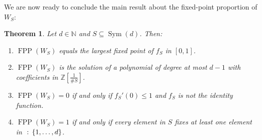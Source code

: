 \documentclass{amsart}
\def\set#1{{\def\st{\;:\;}\left\{#1\right\}}}
\def\ZZ{\mathbb Z}
\def\NN{\mathbb N}
\DeclareMathOperator{\FPP}{FPP}
\DeclareMathOperator{\Sym}{Sym}
\DeclareMathOperator{\st}{st}
\newtheorem{theorem}[Proposition]{Theorem}
\begin{document}
We are now ready to conclude the main result about the fixed-point proportion of $W_S$:

\begin{theorem}
Let $d \in \NN$ and $S \subseteq \Sym(d)$. Then: 
\begin{enumerate}
    \item $\FPP(W_S)$ equals the largest fixed point of $f_S$ in $[0,1]$.
    \item $\FPP(W_S)$ is the solution of a polynomial of degree at most $d-1$ with coefficients in $\ZZ\left[\frac{1}{\# S}\right]$. 
    \item $\FPP(W_S) = 0$ if and only if $f_S'(0) \leq 1$ and $f_S$ is not the identity function.
    \item $\FPP(W_S) = 1$ if and only if every element in $S$ fixes at least one element in $\set{1,\dots,d}$.
\end{enumerate}
\label{theorem: FPP(WS)}
\end{theorem}
\end{document}
